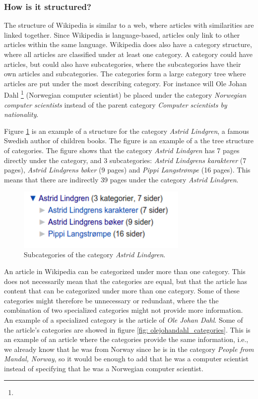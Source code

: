 \documentclass[11pt,english,a4paper]{article}
\begin{document}
\subsubsection{How is it structured?}
The structure of Wikipedia is similar to a web, where articles with similarities are linked together. Since Wikipedia is language-based, articles only link to other articles within the same language. Wikipedia does also have a category structure, where all articles are classified under at least one category. A category could have articles, but could also have subcategories, where the subcategories have their own articles and subcategories. The categories form a large category tree where articles are put under the most describing category. For instance will Ole Johan Dahl \footnote{\olejohandahleng} (Norwegian computer scientist) be placed under the category \textit{Norwegian computer scientists} instead of the parent category \textit{Computer scientists by nationality}.

Figure \ref{fig: subcat_lindgren} is an example of a structure for the category \textit{Astrid Lindgren}, a famous Swedish author of children books. The figure is an example of a the tree structure of categories. The figure shows that the category \textit{Astrid Lindgren} has 7 pages directly under the category, and 3 subcategories: \textit{Astrid Lindgrens karakterer} (7 pages), \textit{Astrid Lindgrens bøker} (9 pages) and \textit{Pippi Langstrømpe} (16 pages).  This means that there are indirectly 39 pages under the category \textit{Astrid Lindgren}. 


\begin{figure}
\centering
\includegraphics[height=3cm]{Dumps/imgs/Kategorier-Astrid-Lindgren.png}
\caption{Subcategories of the category \textit{Astrid Lindgren}. }
\label{fig: subcat_lindgren}
\end{figure}

An article in Wikipedia can be categorized under more than one category. This does not necessarily mean that the categories are equal, but that the article has content that can be categorized under more than one category. Some of these categories might therefore be unnecessary or redundant, where the the combination of two specialized categories might not provide more information. An example of a specialized category is the article of \textit{Ole Johan Dahl}. Some of the article's categories are showed in figure \ref{fig: olejohandahl_categories}. This is an example of an article where the categories provide the same information, i.e., we already know that he was from Norway since he is in the category \textit{People from Mandal, Norway}, so it would be enough to add that he was a computer scientist instead of specifying that he was a Norwegian computer scientist. 
\end{document}
